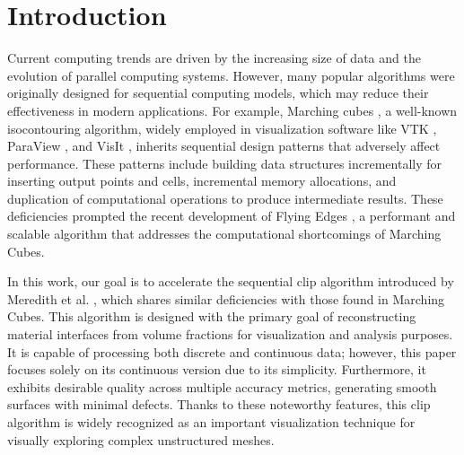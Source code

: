 \documentclass{egpubl}
\begin{document}
\begin{abstract}
\printccsdesc   
\end{abstract}

\section{Introduction}

Current computing trends are driven by the increasing size of data and the evolution of parallel computing systems. However, many popular algorithms were originally designed for sequential computing models, which may reduce their effectiveness in modern applications. For example,  Marching cubes \cite{MC, MCSurvey}, a well-known isocontouring algorithm, widely employed in visualization software like VTK \cite{VTKBook}, ParaView \cite{ParaView}, and VisIt \cite{VisIt}, inherits sequential design patterns that adversely affect performance. These patterns include building data structures incrementally for inserting output points and cells, incremental memory allocations, and duplication of computational operations to produce intermediate results. These deficiencies prompted the recent development of Flying Edges \cite{FE}, a performant and scalable algorithm that addresses the computational shortcomings of Marching Cubes.

In this work, our goal is to accelerate the sequential clip algorithm introduced by Meredith et al. \cite{Clip}, which shares similar deficiencies with those found in Marching Cubes. This algorithm is designed with the primary goal of reconstructing material interfaces from volume fractions for visualization and analysis purposes. It is capable of processing both discrete and continuous data; however, this paper focuses solely on its continuous version due to its simplicity. Furthermore, it exhibits desirable quality across multiple accuracy metrics, generating smooth surfaces with minimal defects. Thanks to these noteworthy features, this clip algorithm is widely recognized as an important visualization technique for visually exploring complex unstructured meshes.
\end{document}
